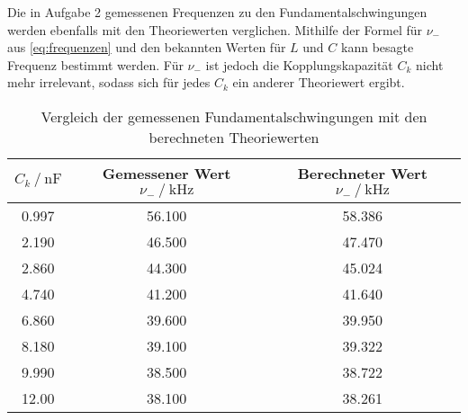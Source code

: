 Die in Aufgabe 2 gemessenen Frequenzen zu den Fundamentalschwingungen werden ebenfalls mit den Theoriewerten verglichen. Mithilfe der Formel für $\nu _-$ aus \autoref{eq:frequenzen} und den bekannten Werten für $L$ und $C$ kann besagte Frequenz bestimmt werden. Für $\nu_-$ ist jedoch die Kopplungskapazität $C_k$ nicht mehr irrelevant, sodass sich für jedes $C_k$ ein anderer Theoriewert ergibt.

\begin{table}
  \centering
  \caption{Vergleich der gemessenen Fundamentalschwingungen mit den berechneten Theoriewerten}
  \label{tab:schwingung}
  \begin{tabular}{c c c}
    \toprule 
    $C_k \:/\: \si{\nano\farad}$ & Gemessener Wert $\nu _- \:/\: \si{\kilo\hertz}$ & Berechneter Wert $\nu _- \:/\: \si{\kilo\hertz}$    \\ 
    \midrule 
    0.997 & 56.100 & 58.386 \\
    2.190 & 46.500 & 47.470 \\
    2.860 & 44.300 & 45.024 \\
    4.740 & 41.200 & 41.640 \\
    6.860 & 39.600 & 39.950 \\
    8.180 & 39.100 & 39.322 \\
    9.990 & 38.500 & 38.722 \\
    12.00 & 38.100 & 38.261 \\
    \bottomrule
  \end{tabular}
\end{table}





